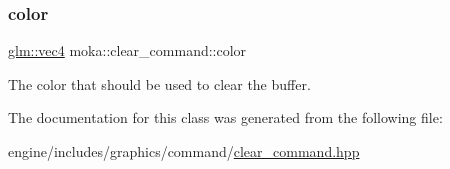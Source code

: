 \subsubsection{\texorpdfstring{color}{color}}
{\footnotesize\ttfamily \mbox{\hyperlink{namespacemoka_aed2224bc0e5b79e57a8975ded94ee1aaa1a9028fd802c481a99491a418ca2fe86}{glm\+::vec4}} moka\+::clear\+\_\+command\+::color}

The color that should be used to clear the buffer. 

The documentation for this class was generated from the following file\+:\begin{DoxyCompactItemize}
\item 
engine/includes/graphics/command/\mbox{\hyperlink{clear__command_8hpp}{clear\+\_\+command.\+hpp}}\end{DoxyCompactItemize}
